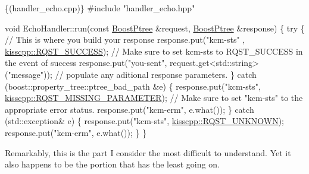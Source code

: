 \begin{DoxyCode}
\{(handler\_echo.cpp)\}
#include \textcolor{stringliteral}{"handler\_echo.hpp"}

\textcolor{keywordtype}{void} EchoHandler::run(\textcolor{keyword}{const} \hyperlink{a00048_ab36820650b8e0db36402aea80485633c}{BoostPtree} &request, \hyperlink{a00048_ab36820650b8e0db36402aea80485633c}{BoostPtree} &response)
\{
  \textcolor{keywordflow}{try} \{
    \textcolor{comment}{// This is where you build your response}
    response.put(\textcolor{stringliteral}{"kcm-sts"} , \hyperlink{a00089_af5792fb0f68695c1a1e7a4c720d9262ea48f403b25d056ead863e1bb74664b388}{kisscpp::RQST\_SUCCESS});                \textcolor{comment}{// Make sure to
       set kcm-sts to RQST\_SUCCESS in the event of success}
    response.put(\textcolor{stringliteral}{"you-sent"}, request.get<std::string>(\textcolor{stringliteral}{"message"}));  \textcolor{comment}{// populate any aditional response
       parameters.}
  \} \textcolor{keywordflow}{catch} (boost::property\_tree::ptree\_bad\_path &e) \{
    response.put(\textcolor{stringliteral}{"kcm-sts"}, \hyperlink{a00089_af5792fb0f68695c1a1e7a4c720d9262ea3ad7cafe8fc0329ea5edde0ebf5c807e}{kisscpp::RQST\_MISSING\_PARAMETER});       \textcolor{comment}{// Make
       sure to set "kcm-sts" to the appropriate error status.}
    response.put(\textcolor{stringliteral}{"kcm-erm"}, e.what());
  \} \textcolor{keywordflow}{catch} (std::exception& e) \{
    response.put(\textcolor{stringliteral}{"kcm-sts"}, \hyperlink{a00089_af5792fb0f68695c1a1e7a4c720d9262ea8b54c6e47b50ce90a375d79b957f5ddb}{kisscpp::RQST\_UNKNOWN});                    
    response.put(\textcolor{stringliteral}{"kcm-erm"}, e.what());
  \}
\}
\end{DoxyCode}


Remarkably, this is the part I consider the most difficult to understand. Yet it also happens to be the portion that has the least going on. 
